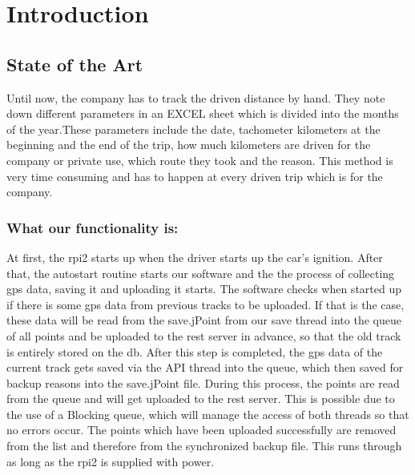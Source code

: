 \newpage
\chapter*{Introduction}
\section*{State of the Art}
Until now, the company has to track the driven distance by hand. They note down different parameters in an EXCEL sheet which is divided into the months of the year.These parameters include the date, tachometer kilometers at the beginning and the end of the trip, how much kilometers are driven for the company or private use, which route they took and the reason.\newline
This method is very time consuming and has to happen at every driven trip which is for the company. 
\subsection*{What our functionality is:}
At first, the \gls{rpi2} starts up when the driver starts up the car's ignition. After that, the autostart routine starts our software and the the process of collecting \gls{gps} data, saving it and uploading it starts.\newline
The software checks when started up if there is some \gls{gps} data from previous tracks to be uploaded. If that is the case, these data will be read from the save.jPoint from our save thread into the queue of all points and be uploaded to the \gls{rest} server in advance, so that the old track is entirely stored on the \gls{db}. \newline
After this step is completed, the \gls{gps} data of the current track gets saved via the API thread into the queue, which then saved for backup reasons into the save.jPoint file.\newline
During this process, the points are read from the queue and will get uploaded to the \gls{rest} server. This is possible due to the use of a Blocking queue, which will manage the access of both threads so that no errors occur.\newline
The points which have been uploaded successfully are removed from the list and therefore from the synchronized backup file.\newline
This runs through as long as the \gls{rpi2} is supplied with power.


\newpage
